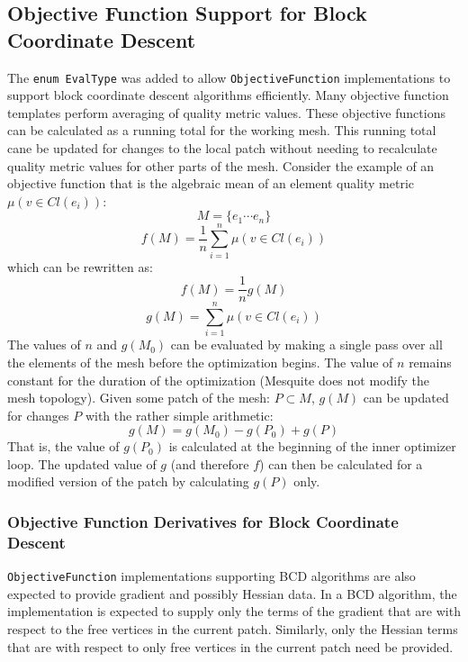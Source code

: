 \documentclass{article}
\begin{document}
\subsection{Objective Function Support for Block Coordinate Descent}

The \texttt{enum EvalType} was added to allow \texttt{ObjectiveFunction} implementations to support block coordinate descent algorithms efficiently.  Many objective function templates perform averaging of quality metric values.  These objective functions can be calculated as a running total for the working mesh.  This running total cane be updated for changes to the local patch without needing to recalculate quality metric values for other parts of the mesh.  Consider the example of an objective function that is the algebraic mean of an element quality metric $\mu(v \in Cl(e_i))$:
\begin{displaymath}
M = \{ e_1 \cdots e_n \}
\end{displaymath}
\begin{displaymath}
f(M) = \frac{1}{n}\sum_{i=1}^{n}\mu(v \in Cl(e_i))
\end{displaymath}
which can be rewritten as:
\begin{displaymath}
f(M) = \frac{1}{n}g(M)
\end{displaymath}
\begin{displaymath}
g(M) = \sum_{i=1}^{n}\mu(v \in Cl(e_i))
\end{displaymath}
The values of $n$ and $g(M_0)$ can be evaluated by making a single pass over all the elements of the mesh before the optimization begins.  The value of $n$ remains constant for the duration of the optimization (Mesquite does not modify the mesh topology).  Given some patch of the mesh: $P \subset M$, $g(M)$ can be updated for changes $P$ with the rather simple arithmetic:
\begin{displaymath}
g(M) = g(M_0) - g(P_0) + g(P)
\end{displaymath}
That is, the value of $g(P_0)$ is calculated at the beginning of the inner optimizer loop.  The updated value of $g$ (and therefore $f$) can then be calculated for a modified version of the patch by calculating $g(P)$ only.


\subsubsection{Objective Function Derivatives for Block Coordinate Descent}

\texttt{ObjectiveFunction} implementations supporting BCD algorithms are also expected to provide gradient and possibly Hessian data.  In a BCD algorithm, the implementation is expected to supply only the terms of the gradient that are with respect to the free vertices in the current patch.  Similarly, only the Hessian terms that are with respect to only free vertices in the current patch need be provided.
\end{document}
